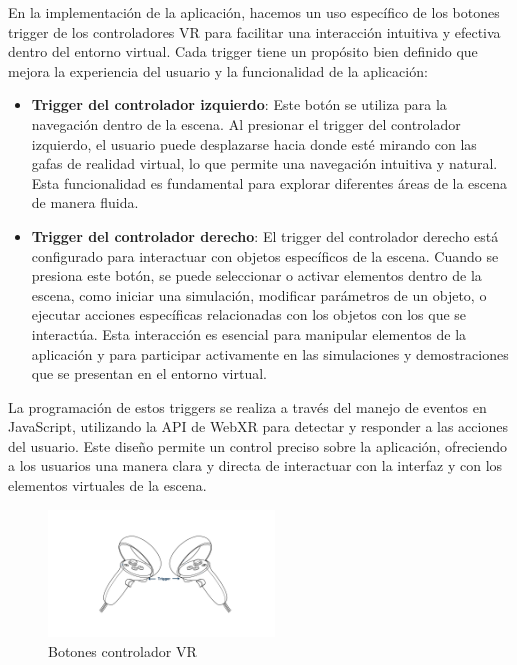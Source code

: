 \documentclass[a4paper, 12pt]{book}
\begin{document}
En la implementación de la aplicación, hacemos un uso específico de los botones trigger de los controladores VR para facilitar una interacción 
intuitiva y efectiva dentro del entorno virtual. Cada trigger tiene un propósito bien definido que mejora la experiencia del 
usuario y la funcionalidad de la aplicación:

\begin{itemize}
  \item \textbf{Trigger del controlador izquierdo}: Este botón se utiliza para la navegación dentro de la escena. Al presionar el trigger del controlador izquierdo, 
  el usuario puede desplazarse hacia donde esté mirando con las gafas de realidad virtual, lo que permite una navegación intuitiva y natural. 
  Esta funcionalidad es fundamental para explorar diferentes áreas de la escena de manera fluida.
  
  \item \textbf{Trigger del controlador derecho}: El trigger del controlador derecho está configurado para interactuar con objetos 
  específicos de la escena. Cuando se presiona este botón, se puede seleccionar o activar elementos dentro de la escena, 
  como iniciar una simulación, modificar parámetros de un objeto, o ejecutar acciones específicas relacionadas con los objetos con los que se interactúa. 
  Esta interacción es esencial para manipular elementos de la aplicación y para participar activamente en las simulaciones y demostraciones que se presentan en el entorno virtual.
\end{itemize}

La programación de estos triggers se realiza a través del manejo de eventos en JavaScript, utilizando la API de WebXR para detectar y responder 
a las acciones del usuario. Este diseño permite un control preciso sobre la aplicación, ofreciendo a los usuarios una manera clara y directa 
de interactuar con la interfaz y con los elementos virtuales de la escena.

\begin{figure}
  \centering
  \includegraphics[width=6cm, keepaspectratio]{img/BotonesControlador.png}
  \caption{Botones controlador VR}
  \label{fig:controladorBotones}
\end{figure}
\end{document}
